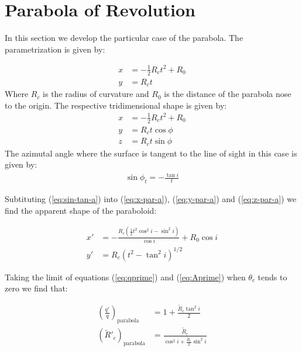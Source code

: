 \section{Parabola of Revolution}
\label{app:parabola}

In this section we develop the particular case of the parabola.
The parametrization is given by:

\begin{align}
x &= - \frac{1}{2}R_ct^2 + R_0 \\
y &= R_c t
\end{align}
Where $R_c$ is the radius of curvature and $R_0$ is the distance of the parabola nose to the
origin.
The respective tridimensional shape is given by:
\begin{align}
x &= -\frac{1}{2}R_ct^2 + R_0 \label{eq:x-par-a}\\
y &= R_c t \cos\phi  \label{eq:y-par-a}\\
z &= R_c t \sin\phi  \label{eq:z-par-a}
\end{align}
The azimutal angle where the surface is tangent to the line of sight in this case is given by:
\begin{align}
\sin\phi_t = -\frac{\tan i}{t} \label{eq:sin-tan-a} 
\end{align}

Subtituting (\ref{eq:sin-tan-a}) into (\ref{eq:x-par-a}), (\ref{eq:y-par-a}) and
(\ref{eq:z-par-a}) we find the apparent shape
of the paraboloid:

\begin{align}
x' &= -\frac{R_c(\frac{1}{2}t^2 \cos^2 i -\sin^2 i)}{\cos i}+R_0\cos i \\
y' &= R_c\left(t^2-\tan^2 i\right)^{1/2} 
\end{align}

Taking the limit of equations (\ref{eq:qprime}) and (\ref{eq:Aprime}) when $\theta_c$ tends to zero we find that:

\begin{align}
\left(\frac{q'}{q}\right)_{\mathrm{parabola}} &= 1+\frac{\tilde{R}_c\tan^2 i}{2}\\
\left(\tilde{R}'_c\right)_{\mathrm{parabola}} &= \frac{\tilde{R}_c}{\cos^2 i + \frac{\tilde{R}_c}{2}\sin^2 i}
\end{align}

